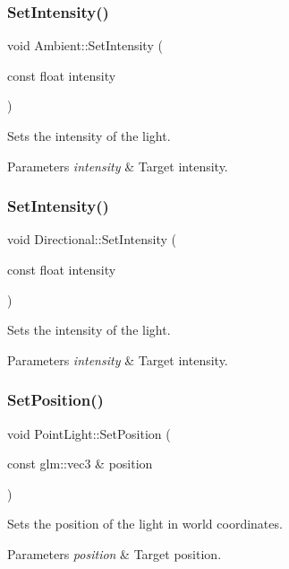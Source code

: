 \subsubsection{\texorpdfstring{Set\+Intensity()}{SetIntensity()}\hspace{0.1cm}{\footnotesize\ttfamily [2/3]}}
{\footnotesize\ttfamily void Ambient\+::\+Set\+Intensity (\begin{DoxyParamCaption}\item[{const float}]{intensity }\end{DoxyParamCaption})\hspace{0.3cm}{\ttfamily [inline]}}

Sets the intensity of the light. 
\begin{DoxyParams}{Parameters}
{\em intensity} & Target intensity. \\
\hline
\end{DoxyParams}
\hypertarget{group___lights_gaa916930bad1e02ef24f89039151be8cd}{}\label{group___lights_gaa916930bad1e02ef24f89039151be8cd} 
\subsubsection{\texorpdfstring{Set\+Intensity()}{SetIntensity()}\hspace{0.1cm}{\footnotesize\ttfamily [3/3]}}
{\footnotesize\ttfamily void Directional\+::\+Set\+Intensity (\begin{DoxyParamCaption}\item[{const float}]{intensity }\end{DoxyParamCaption})\hspace{0.3cm}{\ttfamily [inline]}}

Sets the intensity of the light. 
\begin{DoxyParams}{Parameters}
{\em intensity} & Target intensity. \\
\hline
\end{DoxyParams}
\hypertarget{group___lights_ga21b458bf745d4fe52a62e503a4fb3d24}{}\label{group___lights_ga21b458bf745d4fe52a62e503a4fb3d24} 
\subsubsection{\texorpdfstring{Set\+Position()}{SetPosition()}}
{\footnotesize\ttfamily void Point\+Light\+::\+Set\+Position (\begin{DoxyParamCaption}\item[{const glm\+::vec3 \&}]{position }\end{DoxyParamCaption})\hspace{0.3cm}{\ttfamily [inline]}}

Sets the position of the light in world coordinates. 
\begin{DoxyParams}{Parameters}
{\em position} & Target position. \\
\hline
\end{DoxyParams}
